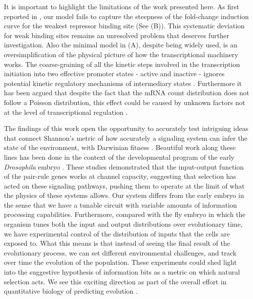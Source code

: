 It is important to highlight the limitations of the work presented here. As
first reported in \cite{Razo-Mejia2018}, our model fails to capture the
steepness of the fold-change induction curve for the weakest repressor binding
site (See (B)). This systematic deviation for weak
binding sites remains an unresolved problem that deserves further
investigation. Also the minimal model in (A), despite
being widely used, is an oversimplification of the physical picture of how the
transcriptional machinery works. The coarse-graining of all the kinetic steps
involved in the transcription initiation into two effective promoter states -
active and inactive - ignores potential kinetic regulatory mechanisms of
intermediary states \cite{Scholes2017}. Furthermore it has been argued that
despite the fact that the mRNA count distribution does not follow a Poisson
distribution, this effect could be caused by unknown factors not at the level
of transcriptional regulation \cite{Choubey2018}.

The findings of this work open the opportunity to accurately test intriguing
ideas that connect Shannon's metric of how accurately a signaling system can
infer the state of the environment, with Darwinian fitness \cite{Taylor2007}.
Beautiful work along these lines has been done in the context of the
developmental program of the early {\it Drosophila} embryo \cite{Tkacik2008,
Petkova2019}. These studies demonstrated that the input-output function of the
pair-rule genes works at channel capacity, suggesting that selection has acted
on these signaling pathways, pushing them to operate at the limit of what the
physics of these systems allows. Our system differs from the early embryo in
the sense that we have a tunable circuit with variable amounts of information
processing capabilities. Furthermore, compared with the fly embryo in which the
organism tunes both the input and output distributions over evolutionary time,
we have experimental control of the distribution of inputs that the cells are
exposed to. What this means is that instead of seeing the final result of the
evolutionary process, we can set different environmental challenges, and track
over time the evolution of the population. These experiments could shed light
into the suggestive hypothesis of information bits as a metric on which natural
selection acts. We see this exciting direction as part of the overall effort in
quantitative biology of predicting evolution \cite{Lassig2017}.
